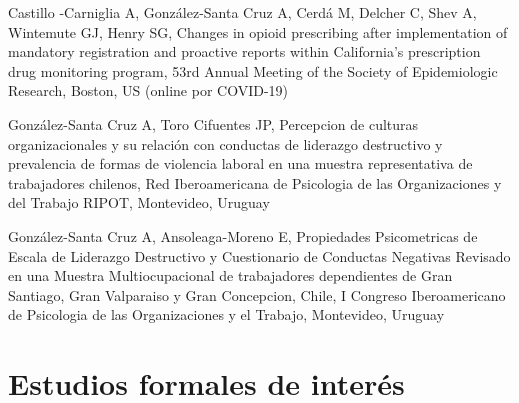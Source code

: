 \documentclass[11pt,a4paper,]{awesome-cv}
\begin{document}
\begin{cventries}
{\begin{cvitems}
\item Castillo -Carniglia A, González-Santa Cruz A, Cerdá M, Delcher C, Shev A, Wintemute GJ, Henry SG, Changes in opioid prescribing after implementation of mandatory registration and proactive reports within California's prescription drug monitoring program, 53rd Annual Meeting of the Society of Epidemiologic Research, Boston, US (online por COVID-19)
\item González-Santa Cruz A, Toro Cifuentes JP, Percepcion de culturas organizacionales y su relación con conductas de liderazgo destructivo y prevalencia de formas de violencia laboral en una muestra representativa de trabajadores chilenos, Red Iberoamericana de Psicologia de las Organizaciones y del Trabajo RIPOT, Montevideo, Uruguay
\item González-Santa Cruz A, Ansoleaga-Moreno E, Propiedades Psicometricas de Escala de Liderazgo Destructivo y Cuestionario de Conductas Negativas Revisado en una Muestra Multiocupacional de trabajadores dependientes de Gran Santiago, Gran Valparaiso y Gran Concepcion, Chile, I Congreso Iberoamericano de Psicologia de las Organizaciones y el Trabajo, Montevideo, Uruguay
\end{cvitems}}
\end{cventries}

\hypertarget{estudios-formales-de-interuxe9s}{%
\section{Estudios formales de
interés}\label{estudios-formales-de-interuxe9s}}

\fontsize{10pt}{1.5em}\color{text}
\begin{cventries}
    \vspace{-4.0mm}
    \vspace{-4.0mm}
    \vspace{-4.0mm}
    \vspace{-4.0mm}
    \vspace{-4.0mm}
\end{cventries}
\end{document}
